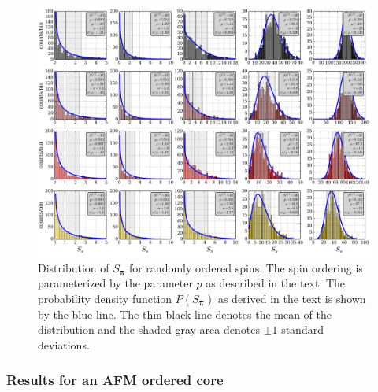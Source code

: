 \documentclass[11pt,letter]{article}
\newcommand{\bv}[1]{\ensuremath{\bm{#1}}}
\begin{document}
\begin{figure}
\centering \includegraphics[width=\textwidth]{figures_140308/Noise_hist_p.png}
\caption[Fluctuations in $S_{\bv{\pi}}$]{\small Distribution of $S_{\bv{\pi}}$
for randomly ordered spins.  The spin ordering is parameterized by the
parameter $p$ as described in the text.  The probability density function
$P(S_{\bv{\pi}})$ as derived in the text is shown by the blue line.  The thin
black line denotes the mean of the distribution and the shaded gray area
denotes $\pm1$ standard deviations. }
\label{fig:spi-noise}
\end{figure}


\subsubsection{Results for an AFM ordered core} 
\end{document}
